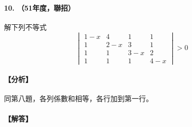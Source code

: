 \paragraph{10. （51年度，聯招）}
解下列不等式
\[ \begin{vmatrix}
1-x & 4 & 1 & 1 \\
1 & 2-x & 3 & 1 \\
1 & 1 & 3-x & 2 \\
1 & 1 & 1 & 4-x
\end{vmatrix} > 0 \]

\paragraph{【分析】}
同第八題，各列係數和相等，各行加到第一行。

\paragraph{【解答】}
